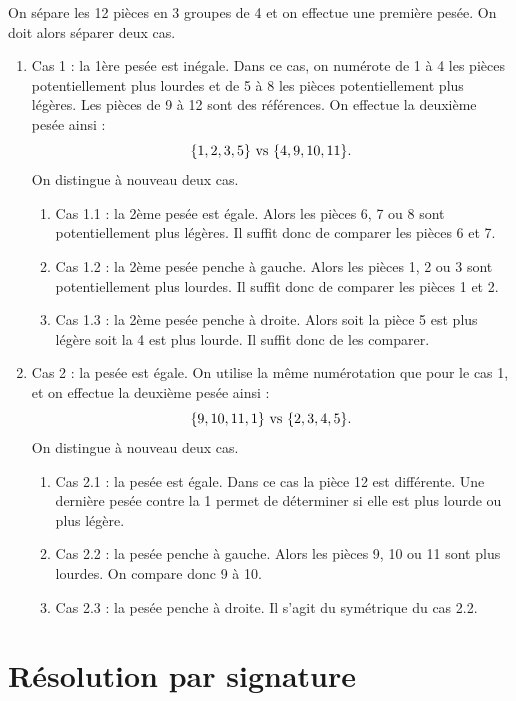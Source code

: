 On sépare les 12 pièces en 3 groupes de 4 et on effectue une première pesée. On doit alors séparer deux cas.
\begin{enumerate}

\item Cas 1 : la 1ère pesée est inégale.
Dans ce cas, on numérote de 1 à 4 les pièces potentiellement plus lourdes
et de 5 à 8 les pièces potentiellement plus légères.
Les pièces de 9 à 12 sont des références.
On effectue la deuxième pesée ainsi :
\[ \{ 1,2,3,5 \} \text{ vs } \{ 4, 9, 10, 11 \} . \]
On distingue à nouveau deux cas.
\begin{enumerate}
\item Cas 1.1 : la 2ème pesée est égale.
Alors les pièces 6, 7 ou 8 sont potentiellement plus légères.
Il suffit donc de comparer les pièces 6 et 7.
\item Cas 1.2 : la 2ème pesée penche à gauche.
Alors les pièces 1, 2 ou 3 sont potentiellement plus lourdes.
Il suffit donc de comparer les pièces 1 et 2.
\item Cas 1.3 : la 2ème pesée penche à droite.
Alors soit la pièce 5 est plus légère soit la 4 est plus lourde.
Il suffit donc de les comparer.
\end{enumerate}
\item Cas 2 : la pesée est égale.
On utilise la même numérotation que pour le cas 1, et on effectue la deuxième pesée ainsi :
\[ \{ 9,10,11,1 \} \text{ vs } \{ 2, 3, 4, 5 \} . \]
On distingue à nouveau deux cas.
\begin{enumerate}
\item Cas 2.1 : la pesée est égale.
Dans ce cas la pièce 12 est différente. 
Une dernière pesée contre la 1 permet de déterminer si elle est plus lourde ou plus légère.
\item Cas 2.2 : la pesée penche à gauche.
Alors les pièces 9, 10 ou 11 sont plus lourdes. On compare donc 9 à 10.
\item Cas 2.3 : la pesée penche à droite.
Il s'agit du symétrique du cas 2.2.
\end{enumerate}
\end{enumerate}

\section{Résolution par signature}

